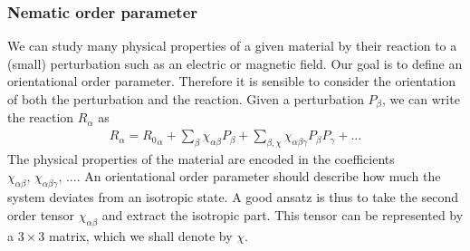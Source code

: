 \subsubsection{Nematic order parameter}
We can study many physical properties of a given material by their reaction to a (small) perturbation such as an electric or magnetic field. Our goal is to define an orientational order parameter. Therefore it is sensible to consider the orientation of both the perturbation and the reaction. Given a perturbation $P_\beta$, we can write the reaction $R_\alpha$ as
\begin{align*} 
    R_\alpha = {R_0}_\alpha + \displaystyle\sum_\beta\chi_{\alpha\beta} P_\beta + \displaystyle\sum_{\beta,\chi}\chi_{\alpha\beta\gamma} P_\beta P_\gamma + ...
\end{align*}
The physical properties of the material are encoded in the coefficients $\chi_{\alpha\beta},\, \chi_{\alpha\beta\gamma},\,...$. An orientational order parameter should describe how much the system deviates from an isotropic state. A good ansatz is thus to take the second order tensor $\chi_{\alpha\beta}$ and extract the isotropic part. This tensor can be represented by a $3\!\times\!3$ matrix, which we shall denote by $\chi$.

